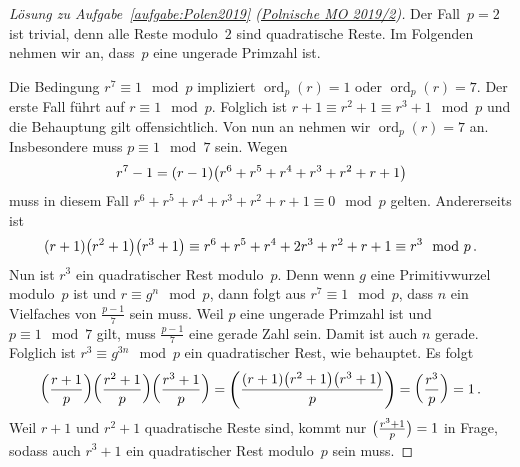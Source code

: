\begin{proof}[Lösung zu Aufgabe~\ref{aufgabe:Polen2019} \textmd{(\href{https://artofproblemsolving.com/community/c904216_2019_polish_mo_finals}{Polnische MO 2019/2})}]
	Der Fall~$p=2$ ist trivial, denn alle Reste modulo~$2$ sind quadratische Reste. Im Folgenden nehmen wir an, dass~$p$ eine ungerade Primzahl ist.
	
	Die Bedingung $r^7\equiv 1\mod p$ impliziert $\operatorname{ord}_p(r)=1$ oder $\operatorname{ord}_p(r)=7$. Der erste Fall führt auf $r\equiv 1\mod p$. Folglich ist $r+1\equiv r^2+1\equiv r^3+1\mod p$ und die Behauptung gilt offensichtlich. Von nun an nehmen wir $\operatorname{ord}_p(r)=7$ an. Insbesondere muss $p\equiv 1\mod 7$ sein. Wegen
	\begin{equation*}
		r^7-1= (r-1)\parens*{r^6+r^5+r^4+r^3+r^2+r+1}
	\end{equation*}
	muss in diesem Fall $r^6+r^5+r^4+r^3+r^2+r+1\equiv 0\mod p$ gelten. Andererseits ist
	\begin{equation*}
		(r+1)\parens*{r^2+1}\parens*{r^3+1}\equiv r^6+r^5+r^4+2r^3+r^2+r+1\equiv r^3\mod p\,.
	\end{equation*}
	Nun ist $r^3$ ein quadratischer Rest modulo~$p$. Denn wenn $g$ eine Primitivwurzel modulo~$p$ ist und $r\equiv g^n\mod p$, dann folgt aus $r^7\equiv1\mod p$, dass $n$ ein Vielfaches von $\frac{p-1}{7}$ sein muss. Weil $p$ eine ungerade Primzahl ist und $p\equiv 1\mod 7$ gilt, muss $\frac{p-1}{7}$ eine gerade Zahl sein. Damit ist auch $n$ gerade. Folglich ist $r^3\equiv g^{3n}\mod p$ ein quadratischer Rest, wie behauptet. Es folgt
	\begin{equation*}
		\parens*{\frac{r+1}{p}}\parens*{\frac{r^2+1}{p}}\parens*{\frac{r^3+1}{p}}=\parens*{\frac{(r+1)\parens*{r^2+1}\parens*{r^3+1}}{p}}=\parens*{\frac{r^3}{p}}=1\,.
	\end{equation*}
	Weil $r+1$ und $r^2+1$ quadratische Reste sind, kommt nur $\parens[\big]{\frac{r^3+1}{p}}=1$ in Frage, sodass auch $r^3+1$ ein quadratischer Rest modulo~$p$ sein muss.
\end{proof}